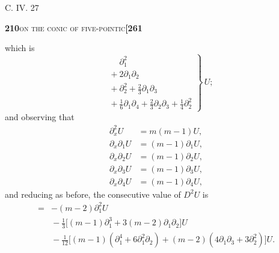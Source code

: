 \documentclass[11pt]{article}
\begin{document}
\hfill C. IV. \hfill 27

\newpage

\noindent\textbf{210}\hfill\textsc{on the conic of five-pointic}\hfill\textbf{[261}

\medskip

\noindent which is
\[
\left.
\begin{aligned}
&\phantom{+}\partial_1^2\\
&{} + 2\partial_1\partial_2\\
&{} + \partial_2^2 + \tfrac{2}{3}\partial_1\partial_3\\
&{} + \tfrac{1}{6}\partial_1\partial_4 + \tfrac{2}{3}\partial_2\partial_3 + \tfrac{1}{4}\partial_2^2
\end{aligned}
\right\}\,U;
\]
and observing that
\[
\begin{aligned}
\partial_x^2 U &= m(m-1)U,\\
\partial_x\partial_1 U &= (m-1)\partial_1 U,\\
\partial_x\partial_2 U &= (m-1)\partial_2 U,\\
\partial_x\partial_3 U &= (m-1)\partial_3 U,\\
\partial_x\partial_4 U &= (m-1)\partial_4 U,
\end{aligned}
\]
and reducing as before, the consecutive value of $D^2U$ is
\[
\begin{aligned}
={}& -(m-2)\partial_1^2 U\\
&{} - \tfrac{1}{3}\bigl[(m-1)\partial_1^3 + 3(m-2)\partial_1\partial_2\bigr]U\\
&{} - \tfrac{1}{12}\bigl[(m-1)(\partial_1^4 + 6\partial_1^2\partial_2) + (m-2)(4\partial_1\partial_3 + 3\partial_2^2)\bigr]U.
\end{aligned}
\]

\medskip
\end{document}
